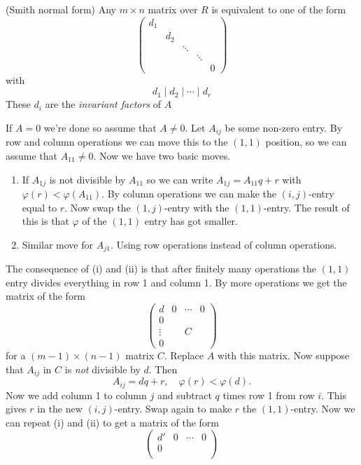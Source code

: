 \documentclass{article}
\begin{document}
\begin{itemize}
\begin{theorem}
	(Smith normal form) Any $ m\times n $ matrix over $ R $ is equivalent to one of the form
	\[
	  \begin{pmatrix}
		  d_1 & & & & \\
		  & d_2 & & & \\
		  & & \ddots & & \\
		  & & & \ddots & \\
		  & & & & 0 
	  \end{pmatrix}
	\]
	with
	\[
	  d_1\mid d_2\mid \cdots \mid d_r
	\]
	These $ d_i $ are the \textit{invariant factors} of $ A $
\end{theorem}
\pf If $ A=0 $ we're done so assume that $ A\ne 0  $. Let $ A_{ij} $ be some non-zero entry. By row and column operations we can move this to the $ (1,1) $ position, so we can assume that $ A_{11}\ne 0 $. Now we have two basic moves.
\begin{enumerate}
\item If $ A_{1j} $ is not divisible by $ A_{11} $ so we can write $ A_{1j}=A_{11}q+r $ with $ \varphi(r)<\varphi(A_{11}) $. By column operations we can make the $ (i,j) $-entry equal to $ r $. Now swap the $ (1,j) $-entry with the $ (1,1) $-entry. The result of this is that $ \varphi $ of the $ (1,1) $ entry has got smaller.
\item Similar move for $ A_{j1} $. Using row operations instead of column operations.
\end{enumerate}
The consequence of (i) and (ii) is that after finitely many operations the $ (1,1) $ entry divides everything in row 1 and column 1. By more operations we get the matrix of the form
\[
  \begin{pmatrix}
	  d & 0 & \cdots & 0 \\
	  0 & & & \\
	  \vdots & & C & \\
	  0 & & &
  \end{pmatrix}
\]
for a $ (m-1)\times(n-1) $ matrix $ C $. Replace $ A $ with this matrix. Now suppose that $ A_{ij} $ in $ C $ is \textit{not} divisible by $ d $. Then
\[
	A_{ij} = dq + r,\quad \varphi(r)<\varphi(d).
\]
Now we add column 1 to column $ j $ and subtract $ q $ times row 1 from row $ i $. This gives $ r $ in the new $ (i,j) $-entry. Swap again to make $ r $ the $ (1,1) $-entry. Now we can repeat (i) and (ii) to get a matrix of the form
\[
  \begin{pmatrix}
	  d' & 0 & \cdots & 0 \\
	  0 & & & \\

\end{pmatrix}\]
\end{itemize}
\end{document}
